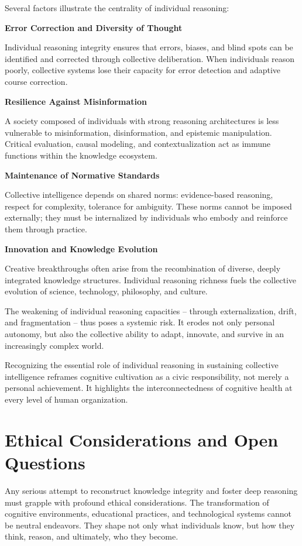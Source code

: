 Several factors illustrate the centrality of individual reasoning:

\textbf{Error Correction and Diversity of Thought}

Individual reasoning integrity ensures that errors, biases, and blind
spots can be identified and corrected through collective deliberation.
When individuals reason poorly, collective systems lose their capacity
for error detection and adaptive course correction.

\textbf{Resilience Against Misinformation}

A society composed of individuals with strong reasoning architectures is
less vulnerable to misinformation, disinformation, and epistemic
manipulation. Critical evaluation, causal modeling, and
contextualization act as immune functions within the knowledge
ecosystem.

\textbf{Maintenance of Normative Standards}

Collective intelligence depends on shared norms: evidence-based
reasoning, respect for complexity, tolerance for ambiguity. These norms
cannot be imposed externally; they must be internalized by individuals
who embody and reinforce them through practice.

\textbf{Innovation and Knowledge Evolution}

Creative breakthroughs often arise from the recombination of diverse,
deeply integrated knowledge structures. Individual reasoning richness
fuels the collective evolution of science, technology, philosophy, and
culture.

The weakening of individual reasoning capacities -- through
externalization, drift, and fragmentation -- thus poses a systemic risk.
It erodes not only personal autonomy, but also the collective ability to
adapt, innovate, and survive in an increasingly complex world.

Recognizing the essential role of individual reasoning in sustaining
collective intelligence reframes cognitive cultivation as a civic
responsibility, not merely a personal achievement. It highlights the
interconnectedness of cognitive health at every level of human
organization.


\section{Ethical Considerations and Open Questions}

Any serious attempt to reconstruct knowledge integrity and foster deep
reasoning must grapple with profound ethical considerations. The
transformation of cognitive environments, educational practices, and
technological systems cannot be neutral endeavors. They shape not only
what individuals know, but how they think, reason, and ultimately, who
they become.

